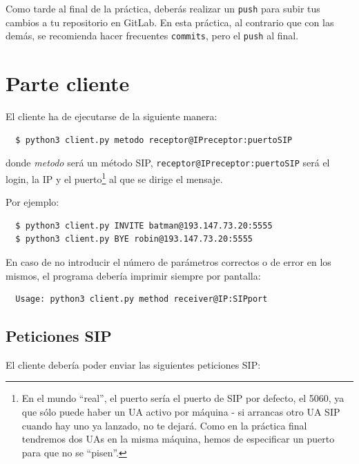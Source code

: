 \documentclass[a4paper,11pt]{article}
\begin{document}
Como tarde al final de la práctica, deberás realizar un \texttt{push} para subir tus cambios a tu repositorio en GitLab. En esta práctica, al contrario que con las demás, se recomienda hacer frecuentes \texttt{commits}, pero el \texttt{push} al final.


\section*{Parte cliente}

El cliente ha de ejecutarse de la siguiente manera:
\begin{verbatim}
  $ python3 client.py metodo receptor@IPreceptor:puertoSIP
\end{verbatim}

donde \emph{metodo} será un método SIP, \texttt{receptor@IPreceptor:puertoSIP}
será el login, la IP y el puerto\footnote{En el mundo ``real'', el puerto sería 
el puerto de SIP por defecto, el 5060, ya que sólo puede haber un UA activo
por máquina - si arrancas otro UA SIP cuando hay uno ya lanzado, no te dejará.
Como en la práctica final tendremos dos UAs en la
misma máquina, hemos de especificar un puerto para que no se ``pisen''.}
al que se dirige el mensaje.

Por ejemplo:
\begin{verbatim}
  $ python3 client.py INVITE batman@193.147.73.20:5555
  $ python3 client.py BYE robin@193.147.73.20:5555
\end{verbatim}

En caso de no introducir el número de parámetros correctos o de error en los mismos, el programa debería imprimir siempre por pantalla:

\begin{verbatim}
  Usage: python3 client.py method receiver@IP:SIPport
\end{verbatim}

\subsection*{Peticiones SIP}

El cliente debería poder enviar las siguientes peticiones SIP:
\end{document}
